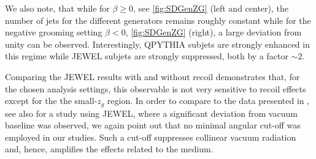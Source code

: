 We also note, that while for $\beta \geq 0$, see \autoref{fig:SDGenZG} (left and center), the number of jets for the different generators remains roughly constant while for the negative grooming setting $\beta < 0$, \autoref{fig:SDGenZG} (right), a large deviation from unity can be observed. Interestingly, QPYTHIA subjets are strongly enhanced in this regime while JEWEL subjets are strongly suppressed, both by a factor $\sim2$.

Comparing the JEWEL results with and without recoil demonstrates that, for the chosen analysis settings, this observable is not very sensitive to recoil effects except for the the small-$z_g$ region.
In order to compare to the data presented in \cite{Sirunyan:2017bsd}, see also \cite{Milhano:2017nzm} for a study using JEWEL, where a significant deviation from vacuum baseline was observed, we again point out that no minimal angular cut-off was employed in our studies. Such a cut-off suppresses collinear vacuum radiation and, hence, amplifies the effects related to the medium.

